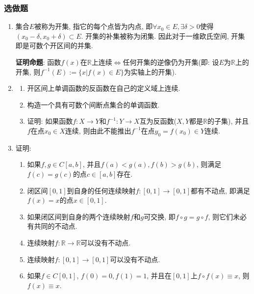 \documentclass[UTF8,11pt, a4paper, oneside, fontset=none]{ctexbook}
\begin{document}
\subsubsection*{选做题}
\begin{enumerate}

\item 集合$E$被称为开集, 指它的每个点皆为内点, 即$\forall x_0 \in E, \exists \delta >0$使得$(x_0 - \delta, x_0 + \delta ) \subset E$. 开集的补集被称为闭集. 因此对于一维欧氏空间, 开集即是可数个开区间的并集.

{\bf 证明命题}: 函数$f(x)$在$\mathbb R$上连续$\Leftrightarrow$任何开集的逆像仍为开集(即: 设$E$为$\mathbb R$上的开集, 则$f^{-1}(E) := \{ x | f(x) \in E \}$为实轴上的开集).

\item 

\begin{enumerate}

\item 开区间上单调函数的反函数在自己的定义域上连续.

\item 构造一个具有可数个间断点集合的单调函数.

\item 证明: 如果函数$f : X \to Y$和$f^{-1} : Y \to X$互为反函数($X, Y$都是$\mathbb R$的子集), 并且$f$在点$x_0 \in X$连续, 则由此不能推出$f^{-1}$在点$y_0 = f(x_0) \in Y$连续.
\end{enumerate}

\item 证明:
\begin{enumerate}

\item 如果$f, g \in C[a, b]$, 并且$f(a) < g(a), f(b) > g(b)$, 则满足$f(c) = g(c)$的点$c \in [a, b]$存在.

\item 闭区间$[0, 1]$到自身的任何连续映射$f : [0, 1] \to [0, 1]$都有不动点, 即满足$f(x) = x$的点$x \in [0, 1]$.

\item 如果闭区间到自身的两个连续映射$f$和$g$可交换, 即$f \circ g = g \circ f$, 则它们未必有共同的不动点. 

\item 连续映射$f : \mathbb R \to \mathbb R$可以没有不动点.

\item 连续映射$f : [0, 1] \to [0, 1]$可以没有不动点.

\item 如果$f \in C[0, 1]$, $f(0) = 0, f(1) = 1$, 并且在$[0, 1]$上$f \circ f (x) \equiv x$, 则$f (x) \equiv x$.
\end{enumerate}


\end{enumerate}
\end{document}
